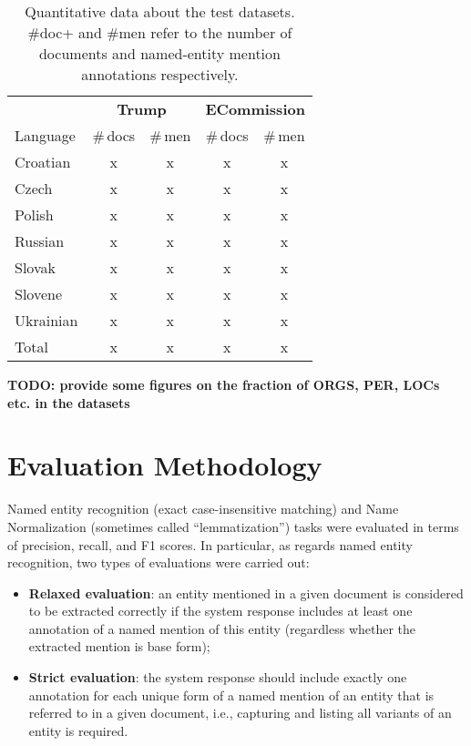 \documentclass[11pt]{article}
\begin{document}
\begin{table}
\begin{center}
\begin{footnotesize}
\begin{tabular}{lcccc}
\toprule 
 & \multicolumn{2}{c}{\textbf{{\sc Trump}}} & \multicolumn{2}{c}{\textbf{{\sc ECommission}}} \\
\cmidrule(lr){2-3}
\cmidrule(lr){4-5}
Language &  \#\,docs & \#\,men & \#\,docs & \#\,men \\
\midrule
Croatian & x & x & x & x \\
Czech & x & x & x & x \\
Polish & x & x & x & x \\
Russian & x & x & x & x \\
Slovak  & x & x & x & x \\
Slovene & x & x & x & x \\
Ukrainian & x & x & x & x \\
\midrule
Total & x & x & x & x  \\
\bottomrule
\end{tabular}
\end{footnotesize}
\end{center}
\caption{Quantitative data about the test datasets. \#doc+ and \#men refer to the number of documents and named-entity mention annotations respectively.}
\label{tab:datasets}
\end{table}

\textbf{TODO: provide some figures on the fraction of ORGS, PER, LOCs etc. in the datasets}

\section{Evaluation Methodology}
\label{sec:evaluation}

Named entity recognition (exact case-insensitive matching) and  Name Normalization (sometimes called “lemmatization”) tasks were evaluated in terms of precision, recall, and F1 scores. In particular, as regards named entity recognition, two types of evaluations were carried out:

\begin{itemize}

\item \textbf{Relaxed evaluation}: an entity mentioned in a given document is considered to be extracted correctly if the system response includes at least one annotation of a named mention of this entity (regardless whether the extracted mention is base form);

\item \textbf{Strict evaluation}: the system response should include exactly one annotation for each unique form of a named mention of an entity that is referred to in a given document, i.e., capturing and listing all variants of an entity is required.

\end{itemize}
\end{document}
